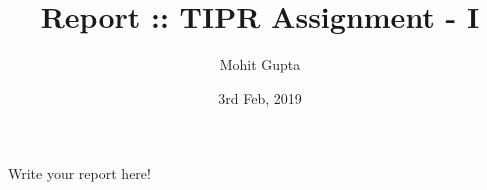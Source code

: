 \documentclass{article}
\title{Report :: TIPR Assignment - I}
\author{Mohit Gupta}
\date{3rd Feb, 2019}
\begin{document}
\maketitle

Write your report here!
\end{document}
